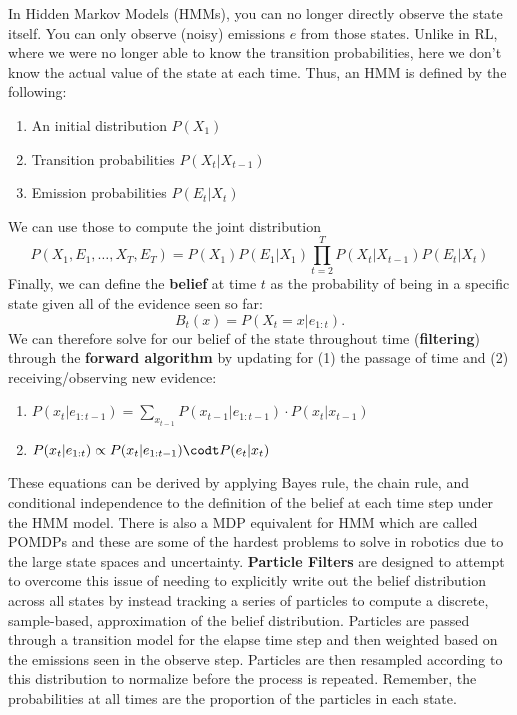 \documentclass[11pt]{article}
\begin{document}
In Hidden Markov Models (HMMs), you can no longer directly observe the state itself. You can only observe (noisy) emissions $e$ from those states. Unlike in RL, where we were no longer able to know the transition probabilities, here we don't know the actual value of the state at each time. Thus, an HMM is defined by the following:
\begin{enumerate}
\item An initial distribution $P(X_1)$
\item Transition probabilities $P(X_{t}|X_{t-1})$
\item Emission probabilities $P(E_t|X_t)$
\end{enumerate}
We can use those to compute the joint distribution
\[
P(X_1, E_1, \ldots, X_T, E_T) = P(X_1) P(E_1|X_1) \prod_{t=2}^T P(X_{t}|X_{t-1}) P(E_t|X_t)
\]
Finally, we can define the \textbf{belief} at time $t$ as the probability of being in a specific state given all of the evidence seen so far:
\[
B_t(x) = P(X_t=x|e_{1:t}).
\]
We can therefore solve for our belief of the state throughout time (\textbf{filtering}) through the \textbf{forward algorithm} by updating for (1) the passage of time and (2) receiving/observing new evidence:
\begin{enumerate}
\item $P(x_t|e_{1:t-1}) = \sum_{x_{t-1}} P(x_{t-1}|e_{1:t-1}) \cdot P(x_t|x_{t-1})$
\item $P(x_t|e_{1:t}) \propto P(x_t|e_{1:t-1}) \codt P(e_t|x_t)$
\end{enumerate}
These equations can be derived by applying Bayes rule, the chain rule, and conditional independence to the definition of the belief at each time step under the HMM model. There is also a MDP equivalent for HMM which are called POMDPs and these are some of the hardest problems to solve in robotics due to the large state spaces and uncertainty. \textbf{Particle Filters} are designed to attempt to overcome this issue of needing to explicitly write out the belief distribution across all states by instead tracking a series of particles to compute a discrete, sample-based, approximation of the belief distribution. Particles are passed through a transition model for the elapse time step and then weighted based on the emissions seen in the observe step. Particles are then resampled according to this distribution to normalize before the process is repeated. Remember, the probabilities at all times are the proportion of the particles in each state.
\end{document}
